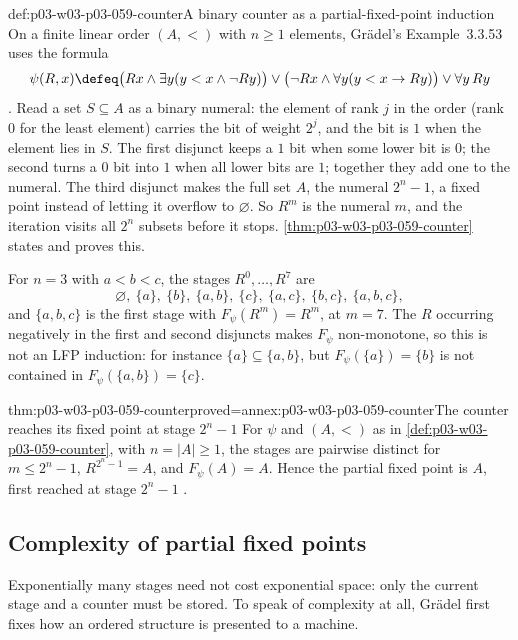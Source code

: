 \begin{hbexample}{def:p03-w03-p03-059-counter}{A binary counter as a partial-fixed-point induction}
On a finite linear order \((A,<)\) with \(n\geq1\) elements, Gr\"adel's
Example~3.3.53 uses the formula
\[
 \psi(R,x)\defeq
 \bigl(Rx\land\exists y(y<x\land\neg Ry)\bigr)\lor
 \bigl(\neg Rx\land\forall y(y<x\to Ry)\bigr)\lor
 \forall y\,Ry
\]
\cite[p.~178]{Gradel2007FMTDescriptiveChapter}. Read a set \(S\subseteq A\) as a binary
numeral: the element of rank \(j\) in the order (rank \(0\) for the least
element) carries the bit of weight \(2^j\), and the bit is \(1\) when the
element lies in \(S\). The first disjunct keeps a \(1\) bit when some lower
bit is \(0\); the second turns a \(0\) bit into \(1\) when all lower bits
are \(1\); together they add one to the numeral. The third disjunct makes
the full set \(A\), the numeral \(2^n-1\), a fixed point instead of letting
it overflow to \(\varnothing\). So \(R^m\) is the numeral \(m\), and the
iteration visits all \(2^n\) subsets before it stops.
\cref{thm:p03-w03-p03-059-counter} states and proves this.

For \(n=3\) with \(a<b<c\), the stages \(R^0,\ldots,R^7\) are
\[
 \varnothing,\ \{a\},\ \{b\},\ \{a,b\},\ \{c\},\ \{a,c\},\ \{b,c\},\ \{a,b,c\},
\]
and \(\{a,b,c\}\) is the first stage with \(F_\psi(R^m)=R^m\), at \(m=7\). The
\(R\) occurring negatively in the first and second disjuncts makes
\(F_\psi\) non-monotone, so this is not an LFP induction: for instance
\(\{a\}\subseteq\{a,b\}\), but \(F_\psi(\{a\})=\{b\}\) is not contained
in \(F_\psi(\{a,b\})=\{c\}\).
\end{hbexample}

\begin{hblemma}{thm:p03-w03-p03-059-counter}{proved=annex:p03-w03-p03-059-counter}{The counter reaches its fixed point at stage \(2^n-1\)}
For \(\psi\) and \((A,<)\) as in \cref{def:p03-w03-p03-059-counter}, with
\(n=|A|\geq1\), the stages are pairwise distinct for \(m\leq2^n-1\),
\(R^{2^n-1}=A\), and \(F_\psi(A)=A\). Hence the partial fixed point is
\(A\), first reached at stage \(2^n-1\)
\cite[p.~178]{Gradel2007FMTDescriptiveChapter}.
\end{hblemma}

\subsection{Complexity of partial fixed points}
\label{sec:p03-w03-p03-059-pfp-complexity}

Exponentially many stages need not cost exponential space: only the current
stage and a counter must be stored. To speak of complexity at all,
Gr\"adel first fixes how an ordered structure is presented to a machine.

